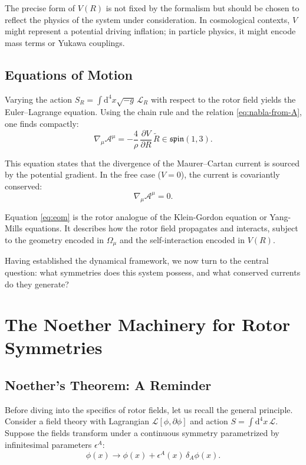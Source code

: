 \documentclass[11pt,a4paper]{article}
\numberwithin{equation}{section}
\theoremstyle{plain}
\theoremstyle{definition}
\theoremstyle{remark}
\newcommand{\dd}{\mathrm{d}}
\begin{document}
The precise form of $V(R)$ is not fixed by the formalism but should be chosen to reflect the physics of the system under consideration. In cosmological contexts, $V$ might represent a potential driving inflation; in particle physics, it might encode mass terms or Yukawa couplings.

\subsection{Equations of Motion}

Varying the action $S_R = \int \dd^4x \sqrt{-g}\, \mathcal{L}_R$ with respect to the rotor field yields the Euler--Lagrange equation. Using the chain rule and the relation \eqref{eq:nabla-from-A}, one finds compactly:
\begin{equation}
\nabla_\mu \mathcal{A}^\mu = -\frac{4}{\rho}\,\frac{\partial V}{\partial R}\,\widetilde{R} \in \mathfrak{spin}(1,3).
\label{eq:eom}
\end{equation}

This equation states that the divergence of the Maurer--Cartan current is sourced by the potential gradient. In the free case ($V=0$), the current is covariantly conserved:
\begin{equation}
\nabla_\mu \mathcal{A}^\mu = 0.
\end{equation}

Equation \eqref{eq:eom} is the rotor analogue of the Klein-Gordon equation or Yang-Mills equations. It describes how the rotor field propagates and interacts, subject to the geometry encoded in $\Omega_\mu$ and the self-interaction encoded in $V(R)$.

Having established the dynamical framework, we now turn to the central question: what symmetries does this system possess, and what conserved currents do they generate?

\section{The Noether Machinery for Rotor Symmetries}
\label{sec:noether}

\subsection{Noether's Theorem: A Reminder}

Before diving into the specifics of rotor fields, let us recall the general principle. Consider a field theory with Lagrangian $\mathcal{L}[\phi, \partial\phi]$ and action $S = \int \dd^4x\, \mathcal{L}$. Suppose the fields transform under a continuous symmetry parametrized by infinitesimal parameters $\epsilon^A$:
\begin{equation}
\phi(x) \to \phi(x) + \epsilon^A(x)\, \delta_A \phi(x).
\end{equation}
\end{document}
